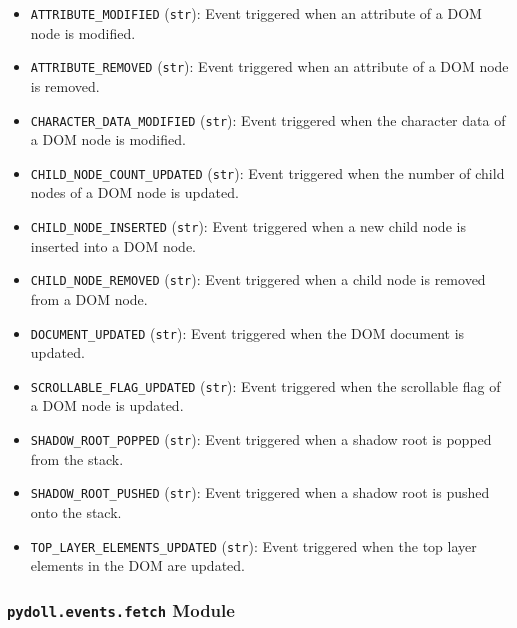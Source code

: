 \documentclass{article}
\begin{document}
\begin{itemize}
    \item \lstinline[style=pythonstyle]|ATTRIBUTE_MODIFIED| (\lstinline[style=pythonstyle]|str|): Event triggered when an attribute of a DOM node is modified.
    \item \lstinline[style=pythonstyle]|ATTRIBUTE_REMOVED| (\lstinline[style=pythonstyle]|str|): Event triggered when an attribute of a DOM node is removed.
    \item \lstinline[style=pythonstyle]|CHARACTER_DATA_MODIFIED| (\lstinline[style=pythonstyle]|str|): Event triggered when the character data of a DOM node is modified.
    \item \lstinline[style=pythonstyle]|CHILD_NODE_COUNT_UPDATED| (\lstinline[style=pythonstyle]|str|): Event triggered when the number of child nodes of a DOM node is updated.
    \item \lstinline[style=pythonstyle]|CHILD_NODE_INSERTED| (\lstinline[style=pythonstyle]|str|): Event triggered when a new child node is inserted into a DOM node.
    \item \lstinline[style=pythonstyle]|CHILD_NODE_REMOVED| (\lstinline[style=pythonstyle]|str|): Event triggered when a child node is removed from a DOM node.
    \item \lstinline[style=pythonstyle]|DOCUMENT_UPDATED| (\lstinline[style=pythonstyle]|str|): Event triggered when the DOM document is updated.
    \item \lstinline[style=pythonstyle]|SCROLLABLE_FLAG_UPDATED| (\lstinline[style=pythonstyle]|str|): Event triggered when the scrollable flag of a DOM node is updated.
    \item \lstinline[style=pythonstyle]|SHADOW_ROOT_POPPED| (\lstinline[style=pythonstyle]|str|): Event triggered when a shadow root is popped from the stack.
    \item \lstinline[style=pythonstyle]|SHADOW_ROOT_PUSHED| (\lstinline[style=pythonstyle]|str|): Event triggered when a shadow root is pushed onto the stack.
    \item \lstinline[style=pythonstyle]|TOP_LAYER_ELEMENTS_UPDATED| (\lstinline[style=pythonstyle]|str|): Event triggered when the top layer elements in the DOM are updated.
\end{itemize}

\subsubsection*{\texttt{pydoll.events.fetch} Module}
\end{document}

